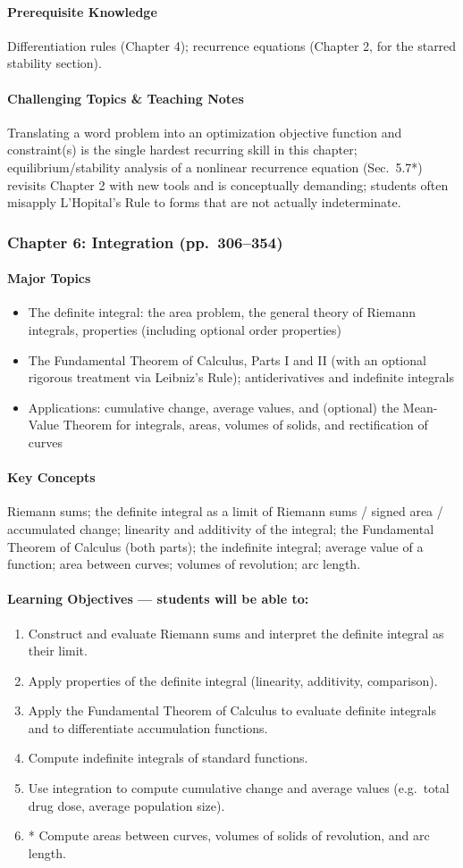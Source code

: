 \documentclass[11pt]{article}
\newcommand{\ChapHead}[2]{\subsubsection{#1 \textnormal{\normalfont\normalsize\color{lightgray}(pp.\ #2)}}}
\newcommand{\MajorTopics}{\paragraph{Major Topics}}
\newcommand{\KeyConcepts}{\paragraph{Key Concepts}}
\newcommand{\LearnObj}{\paragraph{Learning Objectives --- students will be able to:}}
\newcommand{\PreReq}{\paragraph{Prerequisite Knowledge}}
\newcommand{\Hard}{\paragraph{Challenging Topics \& Teaching Notes}}
\begin{document}
\PreReq Differentiation rules (Chapter 4); recurrence equations (Chapter 2, for the starred stability section).

\Hard Translating a word problem into an optimization objective function
and constraint(s) is the single hardest recurring skill in this chapter;
equilibrium/stability analysis of a nonlinear recurrence equation (Sec.\
5.7*) revisits Chapter 2 with new tools and is conceptually demanding;
students often misapply L'Hopital's Rule to forms that are not actually
indeterminate.

\bigskip
\ChapHead{Chapter 6: Integration}{306--354}

\MajorTopics
\begin{itemize}
\item The definite integral: the area problem, the general theory of Riemann integrals, properties (including optional order properties)
\item The Fundamental Theorem of Calculus, Parts I and II (with an optional rigorous treatment via Leibniz's Rule); antiderivatives and indefinite integrals
\item Applications: cumulative change, average values, and (optional) the Mean-Value Theorem for integrals, areas, volumes of solids, and rectification of curves
\end{itemize}

\KeyConcepts
Riemann sums; the definite integral as a limit of Riemann sums / signed
area / accumulated change; linearity and additivity of the integral; the
Fundamental Theorem of Calculus (both parts); the indefinite integral;
average value of a function; area between curves; volumes of revolution;
arc length.

\LearnObj
\begin{enumerate}
\item Construct and evaluate Riemann sums and interpret the definite integral as their limit.
\item Apply properties of the definite integral (linearity, additivity, comparison).
\item Apply the Fundamental Theorem of Calculus to evaluate definite integrals and to differentiate accumulation functions.
\item Compute indefinite integrals of standard functions.
\item Use integration to compute cumulative change and average values (e.g.\ total drug dose, average population size).
\item * Compute areas between curves, volumes of solids of revolution, and arc length.
\end{enumerate}
\end{document}
